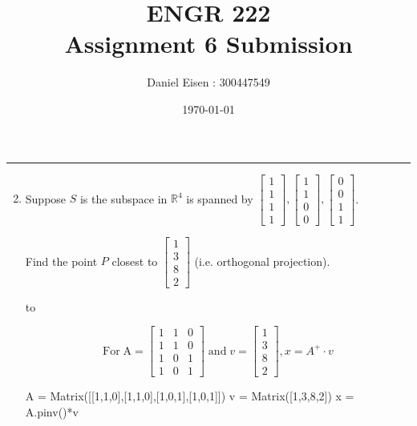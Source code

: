 \documentclass[11pt]{article}
\title{ENGR 222 \\ Assignment 6 Submission}
\author{Daniel Eisen : 300447549}
\date{\today}
\newcommand{\hdotrule}[1]{\hbox to \textwidth{\leaders\hbox to #1pt{\hss . \hss}\hfil}}
\begin{document}
\begin{preview}

      \maketitle
      \hrule
      \begin{enumerate}
            \setcounter{enumi}{1}
            \item Suppose $S$ is the subspace in $\mathbb{R}^4$ is spanned by $\begin{bmatrix} 1\\1\\1\\1 \end{bmatrix},\begin{bmatrix} 1\\1\\0\\0 \end{bmatrix},\begin{bmatrix} 0\\0\\1\\1 \end{bmatrix}$. 
            
            Find the point $P$ closest to $\begin{bmatrix}1\\3\\8\\2\end{bmatrix}$ (i.e. orthogonal projection).

            \hdotrule{5}

            $$\mathrm{For \; A} = \begin{bmatrix}1&1&0\\ 1&1&0\\ 1&0&1\\ 1&0&1 \end{bmatrix} \mathrm{\; and \;} v = \begin{bmatrix}1\\3\\8\\2\end{bmatrix}, x=A^{+}{\cdot}v$$

            \begin{python}
                  A = Matrix([[1,1,0],[1,1,0],[1,0,1],[1,0,1]])
                  v = Matrix([1,3,8,2])
                  x = A.pinv()*v
            \end{python}


\end{enumerate}
\end{preview}
\end{document}
